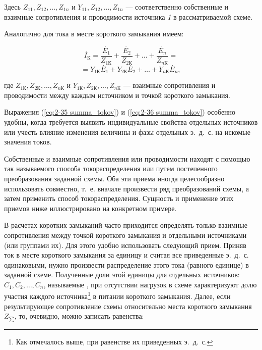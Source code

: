 Здесь $ Z_{11}, Z_{12}, \ldots, Z_{1n} $ и $ Y_{11}, Z_{12}, \ldots, Z_{1n} $ --- соответственно собственные и взаимные сопротивления и проводимости источника \textit{1} в рассматриваемой схеме.

Аналогично для тока в месте короткого замыкания имеем:

\begin{equation*}
	\overset{~.}{I}_{К} = \frac{\overset{~.}{E}_1}{Z_{1\text{К}}} + \frac{\overset{~.}{E}_2}{Z_{2\text{К}}} + \ldots + \frac{\overset{~.}{E}_n}{Z_{n\text{К}}} =
\end{equation*}	
\begin{equation}
	= Y_{1\text{К}}\overset{~.}{E}_1 + Y_{2\text{К}}\overset{~.}{E}_2 + \ldots + Y_{n\text{К}}\overset{~.}{E}_n,
	\label{eq:2-36 summa_tokov}
\end{equation}
  
где $ Z_{1\text{К}}, Z_{2\text{К}}, \ldots, Z_{n\text{К}} $ и $ Y_{1\text{К}}, Z_{2\text{К}}, \ldots, Z_{n\text{К}} $ --- взаимные сопротивления и проводимости между каждым источником и точкой короткого замыкания.

Выражения (\ref{eq:2-35 summa_tokov}) и (\ref{eq:2-36 summa_tokov}) особенно удобны, когда требуется выявить индивидуальные свойства отдельных источников или учесть влияние изменения величины и фазы отдельных э.~д.~с. на искомые значения токов.

Собственные и взаимные сопротивления или проводимости находят с помощью так называемого способа токораспределения или путем постепенного преобразования заданной схемы. Оба эти приема иногда целесообразно использовать совместно, т.~е. вначале произвести ряд преобразований схемы, а затем применить способ токораспределения. Сущность и применение этих приемов ниже иллюстрировано на конкретном примере.

В расчетах коротких замыканий часто приходится определять только взаимные сопротивления между точкой короткого замыкания и отдельными источниками (или группами их). Для этого удобно использовать следующий прием. Приняв ток в месте короткого замыкания за единицу и считая все приведенные э.~д.~с. одинаковыми, нужно произвести распределение этого тока (равного единице) в заданной схеме. Полученные доли этой единицы для отдельных источников: $ C_1, C_2, \ldots, C_n $, называемые , при отсутствии нагрузок в схеме характеризуют долю участия каждого источника\footnote{Как отмечалось выше, при равенстве их приведенных э.~д.~с.} в питании короткого замыкания. Далее, если результирующее сопротивление схемы относительно места короткого замыкания $ Z_{\sum} $, то, очевидно, можно записать равенства:

